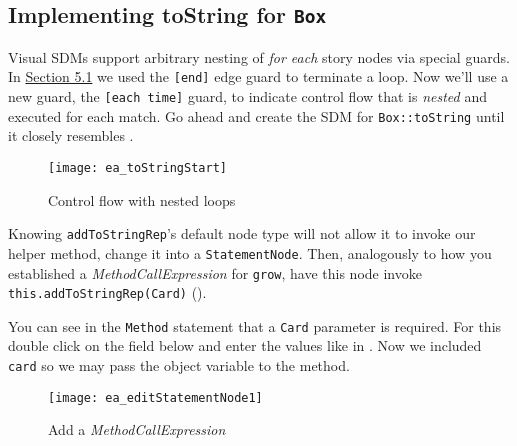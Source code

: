 \newpage
\hypertarget{stringRep vis}{}
\subsection{Implementing toString for \texttt{Box}}
\genHeader

\begin{stepbystep}

\item Visual SDMs support arbitrary nesting of \emph{for each} story nodes via special guards. In \hyperlink{emptyPartition vis}{Section
5.1} we used the \texttt{[end]} edge guard to terminate a loop. Now we'll use a new guard, the \texttt{[each time]} guard, to indicate
control flow that is \emph{nested} and executed for each match. Go ahead and create the SDM for \texttt{Box::toString} until it closely resembles
.

\begin{figure}[htbp]
\begin{center}
  \texttt{[image: ea\_toStringStart]}
  \caption{Control flow with nested loops} 
  \label{ea:sdm_tostring_1}
\end{center}
\end{figure}

\clearpage

\item Knowing \texttt{addToStringRep}'s default node type will not allow it to invoke our helper method, change it
into a \texttt{StatementNode}. Then, analogously to how you established a \emph{MethodCallExpression} for \texttt{grow}, have this node invoke
\texttt{this.addToStringRep(Card)} (). 

\vspace{0.5cm}

\item You can see in the \texttt{Method} statement that a \texttt{Card} parameter is required. For this double click on the field below and enter the values like in . Now we included \texttt{card} so we may pass the object variable to the method.

\vspace{0.5cm}

\begin{figure}[htbp]
\begin{center}
  \texttt{[image: ea\_editStatementNode1]}
  \caption{Add a \emph{MethodCallExpression}}
  \label{ea:editStatement1}
\end{center}
\end{figure}


\end{stepbystep}
